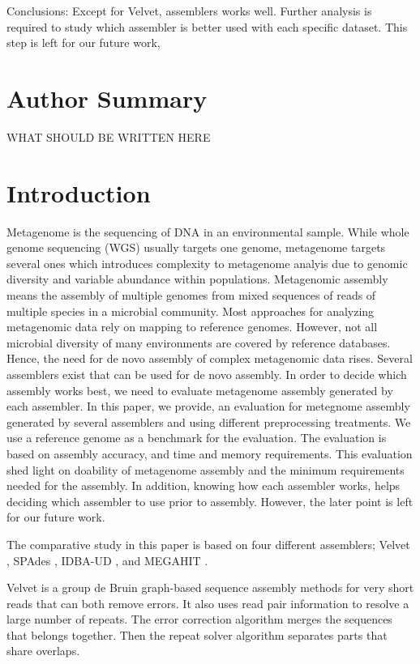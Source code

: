  
Conclusions: Except for Velvet, assemblers works well. Further analysis is required to study which assembler is better used with each specific dataset. This step is left for our future work, 
\section*{Author Summary}

WHAT SHOULD BE WRITTEN HERE


\section*{Introduction}

 
Metagenome is the sequencing of DNA in an environmental sample. While whole genome sequencing (WGS) usually targets one genome, metagenome targets several ones which introduces complexity to metagenome analyis due to genomic diversity and variable abundance within populations.  Metagenomic assembly  means the assembly of multiple genomes from mixed sequences of reads of multiple species in a microbial community.  
Most approaches for analyzing metagenomic data rely on mapping to reference genomes. However, not all microbial diversity of many environments are covered by reference databases. Hence, the need for de novo assembly of complex metagenomic data rises.  
Several assemblers exist that can be used for de novo assembly. In order to decide which assembly works best, we need to evaluate metagenome assembly generated by each assembler.  In this paper, we provide, an evaluation for metegnome assembly generated by several assemblers and using different preprocessing treatments. We use a reference genome as a benchmark for the evaluation.  The evaluation is based on assembly accuracy, and time and memory requirements. This evaluation shed light on doability of metagenome assembly and the minimum requirements needed for the assembly. In addition, knowing how each assembler works, helps deciding which assembler to use prior to assembly. However, the later point is left for our future work. 
 
The comparative study in this paper is based on four different assemblers; Velvet \cite{velvet}, SPAdes \cite {spades}, IDBA-UD \cite{idba}, and MEGAHIT \cite{megahit}.  


Velvet \cite{velvet} is a group de Bruin graph-based sequence assembly methods for very short reads that can both remove errors. It also uses read pair information to resolve a large number of repeats.  The error correction algorithm merges the sequences that belongs together. Then the repeat solver algorithm separates parts that share overlaps. 


